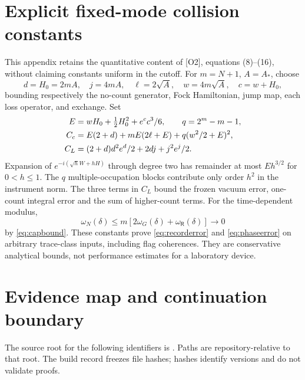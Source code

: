 \documentclass[11pt,letterpaper]{article}
\numberwithin{equation}{section}
\theoremstyle{remark}
\newcommand{\loss}{\mathsf R}
\newcommand{\ev}[1]{\textsf{[#1]}}
\begin{document}
\section{Explicit fixed-mode collision constants}
\label{sec:constants}
This appendix retains the quantitative content of \ev{O2}, equations
(8)--(16), without claiming constants uniform in the cutoff. For
$m=N+1$, $A=A_*$, choose
\[
 d=H_0=2mA,\quad j=4mA,\quad \ell=2\sqrt A,\quad
 w=4m\sqrt A,\quad c=w+H_0,
\]
bounding respectively the no-count generator, Fock Hamiltonian,
jump map, each loss operator, and exchange. Set
\begin{align}
 E&=wH_0+\tfrac12H_0^2+e^cc^3/6,\qquad q=2^m-m-1,\notag\\
 C_c&=E(2+d)+mE(2\ell+E)+q(w^2/2+E)^2,\notag\\
 C_L&=(2+d)d^2e^d/2+2dj+j^2e^j/2. \label{eq:explicitconstants}
\end{align}
Expansion of $e^{-i(\sqrt hW+hH)}$ through degree two has remainder
at most $Eh^{3/2}$ for $0<h\le1$. The $q$ multiple-occupation blocks
contribute only order $h^2$ in the instrument norm. The three terms in
$C_L$ bound the frozen vacuum error, one-count integral error and the
sum of higher-count terms. For the time-dependent modulus,
\[
 \omega_N(\delta)\le m[2\omega_G(\delta)+\omega_{\loss}(\delta)]
 \longrightarrow0
\]
by \eqref{eq:capbound}. These constants prove
\eqref{eq:recorderror} and \eqref{eq:phaseerror} on arbitrary
trace-class inputs, including flag coherences. They are conservative
analytical bounds, not performance estimates for a laboratory device.

\section{Evidence map and continuation boundary}
\label{sec:evidence}
The source root for the following identifiers is
.
Paths are repository-relative to that root. The build record freezes
file hashes; hashes identify versions and do not validate proofs.
\end{document}
